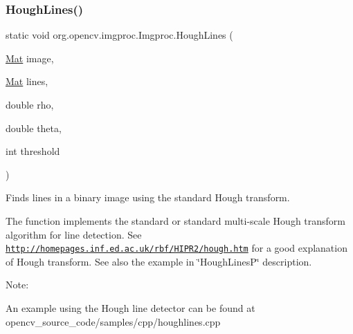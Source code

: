\subsubsection{\texorpdfstring{Hough\+Lines()}{HoughLines()}\hspace{0.1cm}{\footnotesize\ttfamily [2/2]}}
{\footnotesize\ttfamily static void org.\+opencv.\+imgproc.\+Imgproc.\+Hough\+Lines (\begin{DoxyParamCaption}\item[{\mbox{\hyperlink{classorg_1_1opencv_1_1core_1_1_mat}{Mat}}}]{image,  }\item[{\mbox{\hyperlink{classorg_1_1opencv_1_1core_1_1_mat}{Mat}}}]{lines,  }\item[{double}]{rho,  }\item[{double}]{theta,  }\item[{int}]{threshold }\end{DoxyParamCaption})\hspace{0.3cm}{\ttfamily [static]}}

Finds lines in a binary image using the standard Hough transform.

The function implements the standard or standard multi-\/scale Hough transform algorithm for line detection. See \href{http://homepages.inf.ed.ac.uk/rbf/HIPR2/hough.htm}{\tt http\+://homepages.\+inf.\+ed.\+ac.\+uk/rbf/\+H\+I\+P\+R2/hough.\+htm} for a good explanation of Hough transform. See also the example in \char`\"{}\+Hough\+Lines\+P\char`\"{} description.

Note\+:


\begin{DoxyItemize}
\item An example using the Hough line detector can be found at opencv\+\_\+source\+\_\+code/samples/cpp/houghlines.\+cpp 
\end{DoxyItemize}


